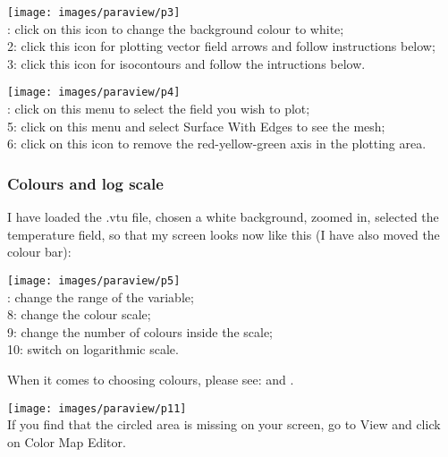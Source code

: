 \begin{center}
\texttt{[image: images/paraview/p3]}\\
{: click on this icon to change the background colour to white;\\
2: click this icon for plotting vector field arrows and follow instructions below;\\
3: click this icon for isocontours and follow the intructions below.\\}
\end{center}


\begin{center}
\texttt{[image: images/paraview/p4]}\\
{: click on this menu to select the field you wish to plot;\\
5: click on this menu and select Surface With Edges to see the mesh;\\
6: click on this icon to remove the red-yellow-green axis in the plotting area.\\}
\end{center}



\subsubsection*{Colours and log scale}

I have loaded the .vtu file, chosen a white background, zoomed in, selected the temperature field, so that 
my screen looks now like this (I have also moved the colour bar):

\begin{center}
\texttt{[image: images/paraview/p5]}\\
{: change the range of the variable; \\
8: change the colour scale; \\
9: change the number of colours inside the scale; \\
10: switch on logarithmic scale.}
\end{center}

When it comes to choosing colours, please see: 
\textcite{crsh20} and  \textcite{vacp22}.


\begin{center}
\texttt{[image: images/paraview/p11]}\\
{\captionfont If you find that the circled area is missing on your screen, 
go to View and click on Color Map Editor.}
\end{center}

